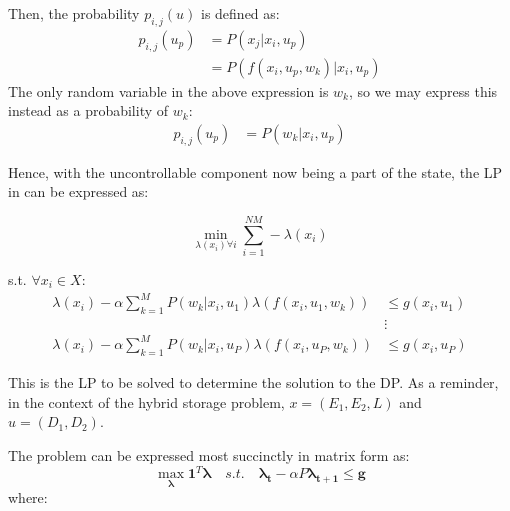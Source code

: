 \documentclass[conference]{IEEEtran}
\begin{document}
Then, the probability $p_{i,j}(u)$ is defined as: \begin{align*} 
p_{i,j}(u_{p})&= P(x_{j}| x_{i},u_{p})\\ 
&= P(f(x_{i},u_{p},w_{k})| x_{i},u_{p})
\end{align*} The only random variable in the above expression is $w_{k}$, so we may express this instead as a probability of $w_{k}$:
\begin{align*} 
    p_{i,j}(u_{p})&= P(w_{k} | x_{i},u_{p})
\end{align*}

Hence, with the uncontrollable component now being a part of the state, the LP in \cite{Bertsekas:2007:DPO:1396348} can be expressed as:

\begin{equation} \label{eq:prelimLP}
\min_{\lambda(x_{i}) \forall i} \sum_{i=1}^{NM} -\lambda(x_{i})
\end{equation}

s.t. $\forall x_{i} \in X$: \begin{align*}
\lambda(x_{i})-\alpha\sum_{k=1}^{M}P(w_{k} | x_{i},u_{1})\lambda(f(x_{i},u_{1},w_{k})) &\leq g(x_{i},u_{1}) \\
&\vdots\\
\lambda(x_{i})-\alpha\sum_{k=1}^{M}P(w_{k} | x_{i},u_{P})\lambda(f(x_{i},u_{P},w_{k})) &\leq g(x_{i},u_{P})
\end{align*}

This is the LP to be solved to determine the solution to the DP. As a reminder, in the context of the hybrid storage problem, $x=(E_{1},E_{2},L)$ and $u=(D_{1},D_{2})$.

The problem can be expressed most succinctly in matrix form as:
\begin{equation} \label{eq:prelimLPmtx}
    \max_{\boldsymbol{\lambda}} \boldsymbol{1}^{T} \boldsymbol{\lambda}
    \hspace{1em}s.t.\hspace{1em}
    \boldsymbol{\lambda_{t}}-\alpha P\boldsymbol{\lambda_{t+1}} \leq \boldsymbol{g}
\end{equation} where:
\end{document}
